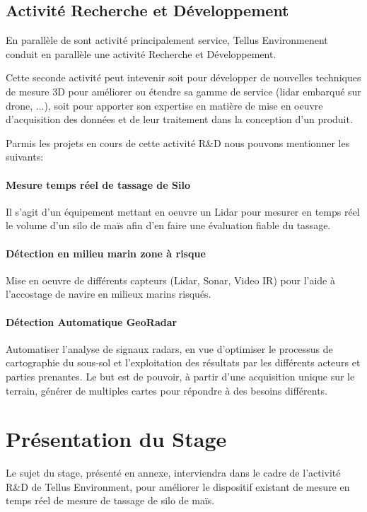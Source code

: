 \documentclass[12pt,a4paper]{report}
\begin{document}
\subsection{Activité Recherche et Développement}
En parallèle de sont activité principalement service, Tellus Environmenent conduit en parallèle une activité Recherche et Développement.

Cette seconde activité peut intevenir soit pour développer de nouvelles techniques de mesure 3D pour améliorer ou étendre sa gamme de service (lidar embarqué sur drone, ...), soit pour apporter son expertise en matière de mise en oeuvre d'acquisition des données et de leur traitement dans la conception d'un produit.

Parmis les projets en cours de cette activité R\&D nous pouvons mentionner les suivants:


\paragraph{Mesure temps réel de tassage de Silo} Il s'agit d'un équipement mettant en oeuvre un Lidar pour mesurer en temps réel le volume d'un silo de maïs afin d'en faire une évaluation fiable du tassage.

\paragraph{Détection en milieu marin zone à risque} Mise en oeuvre de différents capteurs  (Lidar, Sonar, Video IR) pour l'aide à l'accostage de navire en milieux marins risqués.

\paragraph{Détection Automatique GeoRadar} Automatiser l'analyse de signaux radars, en vue d'optimiser le processus de cartographie du sous-sol et l'exploitation des résultats par les différents acteurs et parties prenantes. Le but est de pouvoir, à partir d'une acquisition unique sur le terrain, générer de multiples cartes pour répondre à des besoins différents.

\section{Présentation du Stage}
Le sujet du stage, présenté en annexe, interviendra dans le cadre de l'activité R\&D de Tellus Environment, pour améliorer le dispositif existant de mesure en temps réel de mesure de tassage de silo de maïs.
\end{document}
